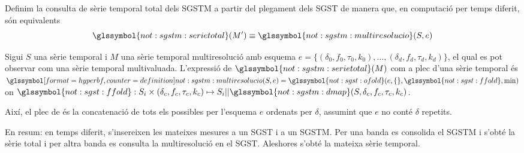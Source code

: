 Definim la consulta de sèrie temporal total dels \gls{SGSTM} a partir
del plegament dels \gls{SGST} de manera que, en computació per temps
diferit, són equivalents
\[
\glssymbol{not:sgstm:serietotal}(M') \equiv \glssymbol{not:sgstm:multiresolucio}(S,e)
\]

\begin{definition}
  Sigui $S$ una sèrie temporal i $M$ una sèrie temporal multiresolució
  amb esquema $e = \{ (\delta_0,f_0,\tau_0,k_0), \ldots,
  (\delta_d,f_d,\tau_d,k_d)\}$, el qual es pot observar com una sèrie
  temporal multivaluada.  L'expressió de
  $\glssymbol{not:sgstm:serietotal}(M)$ com a plec d'una sèrie
  temporal és $\glssymboldef{not:sgstm:multiresolucio}(S,e)=
  \glssymbol{not:sgst:ofold}(e,\{\},\glssymbol{not:sgst:ffold},\min)$
  on $\glssymbol{not:sgst:ffold}: S_i \times (\delta_c,f_c,\tau_c,k_c)
  \mapsto S_i ||
  \glssymbol{not:sgstm:dmap}(S,\delta_c,f_c,\tau_c,k_c)$.

  Així, el plec de  és la concatenació de
  tots els  possibles per l'esquema $e$
  ordenats per $\delta$, assumint que $e$ no conté $\delta$ repetits.
\end{definition}



En resum: en temps diferit, s'insereixen les mateixes mesures a un
\gls{SGST} i a un \gls{SGSTM}. Per una banda es consolida el
\gls{SGSTM} i s'obté la sèrie total i per altra banda es consulta la
multiresolució en el \gls{SGST}. Aleshores s'obté la mateixa sèrie
temporal.


